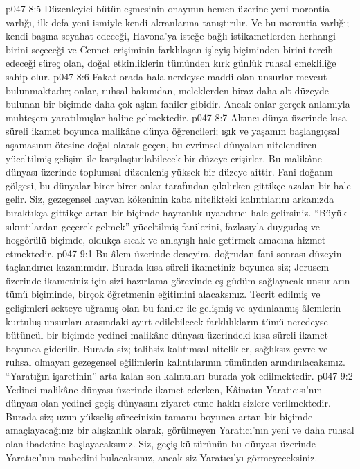 \vs p047 8:5 Düzenleyici bütünleşmesinin onayının hemen üzerine yeni morontia varlığı, ilk defa yeni ismiyle kendi akranlarına tanıştırılır. Ve bu morontia varlığı; kendi başına seyahat edeceği, Havona’ya isteğe bağlı istikametlerden herhangi birini seçeceği ve Cennet erişiminin farklılaşan işleyiş biçiminden birini tercih edeceği süreç olan, doğal etkinliklerin tümünden kırk günlük ruhsal emekliliğe sahip olur.
\vs p047 8:6 Fakat orada hala nerdeyse maddi olan unsurlar mevcut bulunmaktadır; onlar, ruhsal bakımdan, meleklerden biraz daha alt düzeyde bulunan bir biçimde daha çok aşkın faniler gibidir. Ancak onlar gerçek anlamıyla muhteşem yaratılmışlar haline gelmektedir.
\vs p047 8:7 Altıncı dünya üzerinde kısa süreli ikamet boyunca malikâne dünya öğrencileri; ışık ve yaşamın başlangıçsal aşamasının ötesine doğal olarak geçen, bu evrimsel dünyaları nitelendiren yüceltilmiş gelişim ile karşılaştırılabilecek bir düzeye erişirler. Bu malikâne dünyası üzerinde toplumsal düzenleniş yüksek bir düzeye aittir. Fani doğanın gölgesi, bu dünyalar birer birer onlar tarafından çıkılırken gittikçe azalan bir hale gelir. Siz, gezegensel hayvan kökeninin kaba nitelikteki kalıntılarını arkanızda bıraktıkça gittikçe artan bir biçimde hayranlık uyandırıcı hale gelirsiniz. “Büyük sıkıntılardan geçerek gelmek” yüceltilmiş fanilerini, fazlasıyla duygudaş ve hoşgörülü biçimde, oldukça sıcak ve anlayışlı hale getirmek amacına hizmet etmektedir.
\vs p047 9:1 Bu âlem üzerinde deneyim, doğrudan fani\hyp{}sonrası düzeyin taçlandırıcı kazanımıdır. Burada kısa süreli ikametiniz boyunca siz; Jerusem üzerinde ikametiniz için sizi hazırlama görevinde eş güdüm sağlayacak unsurların tümü biçiminde, birçok öğretmenin eğitimini alacaksınız. Tecrit edilmiş ve gelişimleri sekteye uğramış olan bu faniler ile gelişmiş ve aydınlanmış âlemlerin kurtuluş unsurları arasındaki ayırt edilebilecek farklılıkların tümü neredeyse bütüncül bir biçimde yedinci malikâne dünyası üzerindeki kısa süreli ikamet boyunca giderilir. Burada siz; talihsiz kalıtımsal nitelikler, sağlıksız çevre ve ruhsal olmayan gezegensel eğilimlerin kalıntılarının tümünden arındırılacaksınız. “Yaratığın işaretinin” arta kalan son kalıntıları burada yok edilmektedir.
\vs p047 9:2 Yedinci malikâne dünyası üzerinde ikamet ederken, Kâinatın Yaratıcısı’nın dünyası olan yedinci geçiş dünyasını ziyaret etme hakkı sizlere verilmektedir. Burada siz; uzun yükseliş sürecinizin tamamı boyunca artan bir biçimde amaçlayacağınız bir alışkanlık olarak, görülmeyen Yaratıcı’nın yeni ve daha ruhsal olan ibadetine başlayacaksınız. Siz, geçiş kültürünün bu dünyası üzerinde Yaratıcı’nın mabedini bulacaksınız, ancak siz Yaratıcı’yı görmeyeceksiniz.
